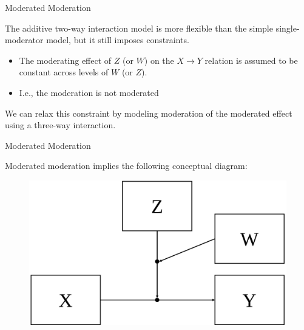 \documentclass{beamer}
\newcommand{\va}[0]{\vspace{12pt}}
\newcommand{\vb}[0]{\vspace{6pt}}
\begin{document}
\begin{frame}{Moderated Moderation}
  
  The additive two-way interaction model is more flexible than the
  simple single-moderator model, but it still imposes constraints.
  \va
  \begin{itemize}
    \item The moderating effect of $Z$ (or $W$) on the $X \rightarrow
      Y$ relation is assumed to be constant across levels of $W$ (or
      $Z$).
      \vb
    \item I.e., the moderation is not moderated
  \end{itemize}
  
  \va
  We can relax this constraint by modeling moderation of the moderated
  effect using a three-way interaction.
  
\end{frame}



\begin{frame}{Moderated Moderation}
  
  Moderated moderation implies the following conceptual diagram:
  \begin{figure}
    \includegraphics[width=\textwidth]{figures/threeWayConceptual.pdf}
  \end{figure}
  
\end{frame}
\end{document}
